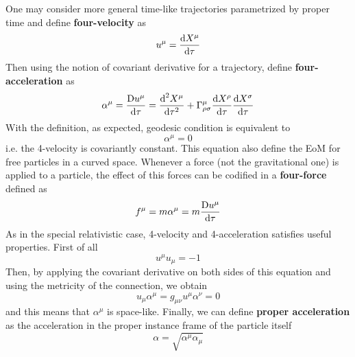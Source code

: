 \documentclass[../main/main.tex]{subfiles}
\begin{document}
One may consider more general time-like trajectories parametrized by proper time and define \textbf{four-velocity} as
\[u^\mu=\frac{\textup{d} X^\mu}{\textup{d} \tau}\]
Then using the notion of covariant derivative for a trajectory, define \textbf{four-acceleration} as
\[\alpha^\mu=\frac{\text{D}u^\mu}{\textup{d}\tau}=\frac{\textup{d}^2 X^\mu}{\textup{d}\tau^2}+{\Gamma}^{\mu}_{\rho \sigma}\frac{\textup{d} X^\rho}{\textup{d} \tau}\frac{\textup{d} X^\sigma}{\textup{d} \tau}\]
With the definition, as expected, geodesic condition is equivalent to 
\[\alpha^\mu=0\]
i.e. the 4-velocity is covariantly constant. This equation also define the EoM for free particles in a curved space. Whenever a force (not the gravitational one) is applied to a particle, the effect of this forces can be codified in a \textbf{four-force} defined as
\[f^\mu=m\alpha^\mu=m\frac{\text{D}u^\mu}{\textup{d}\tau}\]
As in the special relativistic case, 4-velocity and 4-acceleration satisfies useful properties. First of all
\[u^\mu u_\mu=-1\]
Then, by applying the covariant derivative on both sides of this equation and using the  metricity of the connection, we obtain
\[u_\mu\alpha^\mu=g_{\mu\nu}u^\mu\alpha^\nu=0\]
and this means that $\alpha^\mu$ is space-like. 
Finally, we can define \textbf{proper acceleration} as the acceleration in the proper instance frame of the particle itself
\[\alpha=\sqrt{\alpha^\mu\alpha_\mu}\]
\end{document}
